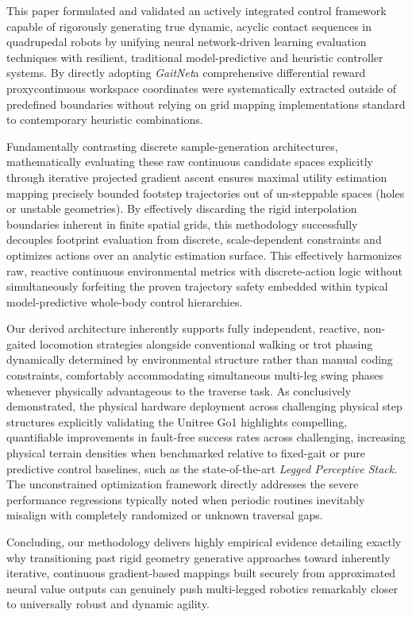 This paper formulated and validated an actively integrated control framework capable of rigorously generating true dynamic, acyclic contact sequences in quadrupedal robots by unifying neural network-driven learning evaluation techniques with resilient, traditional model-predictive and heuristic controller systems. By directly adopting \textit{GaitNet}\textemdash a comprehensive differential reward proxy\textemdash continuous workspace coordinates were systematically extracted outside of predefined boundaries without relying on grid mapping implementations standard to contemporary heuristic combinations. 

Fundamentally contrasting discrete sample-generation architectures, mathematically evaluating these raw continuous candidate spaces explicitly through iterative projected gradient ascent ensures maximal utility estimation mapping precisely bounded footstep trajectories out of un-steppable spaces (holes or unstable geometries). By effectively discarding the rigid interpolation boundaries inherent in finite spatial grids, this methodology successfully decouples footprint evaluation from discrete, scale-dependent constraints and optimizes actions over an analytic estimation surface. This effectively harmonizes raw, reactive continuous environmental metrics with discrete-action logic without simultaneously forfeiting the proven trajectory safety embedded within typical model-predictive whole-body control hierarchies.

Our derived architecture inherently supports fully independent, reactive, non-gaited locomotion strategies alongside conventional walking or trot phasing dynamically determined by environmental structure rather than manual coding constraints, comfortably accommodating simultaneous multi-leg swing phases whenever physically advantageous to the traverse task. As conclusively demonstrated, the physical hardware deployment across challenging physical step structures explicitly validating the Unitree Go1 highlights compelling, quantifiable improvements in fault-free success rates across challenging, increasing physical terrain densities when benchmarked relative to fixed-gait or pure predictive control baselines, such as the state-of-the-art \textit{Legged Perceptive Stack}. The unconstrained optimization framework directly addresses the severe performance regressions typically noted when periodic routines inevitably misalign with completely randomized or unknown traversal gaps. 

Concluding, our methodology delivers highly empirical evidence detailing exactly why transitioning past rigid geometry generative approaches toward inherently iterative, continuous gradient-based mappings built securely from approximated neural value outputs can genuinely push multi-legged robotics remarkably closer to universally robust and dynamic agility. 

